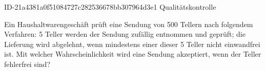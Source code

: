 \begin{exercise}
      {ID-21a4381a0f51084727c282536678bb307964d3e1}
      {Qualitätskontrolle}
  \ifproblem\problem\par
    Ein Haushaltwarengeschäft prüft eine Sendung von 500 Tellern nach
    folgendem Verfahren: 5 Teller werden der Sendung zufällig entnommen
    und geprüft; die Lieferung wird abgelehnt, wenn mindestens einer
    dieser 5 Teller nicht einwandfrei ist. Mit welcher Wahrscheinlichkeit
    wird eine Sendung akzeptiert, wenn  der Teller fehlerfrei sind?
  \fi
\end{exercise}
